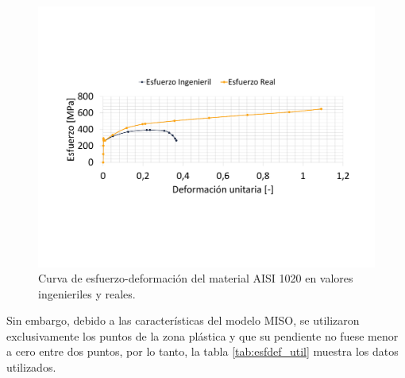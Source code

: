 
\begin{figure}[h]
\centering
\includegraphics[width=1\linewidth, trim={2cm 6cm 2cm 5cm},clip]{Imagenes/esf_real_ing.pdf}
\caption{Curva de esfuerzo-deformación del material AISI 1020 en valores ingenieriles y reales.}
\label{fig:esf_realing1}
\end{figure}

Sin embargo, debido a las características del modelo MISO, se utilizaron exclusivamente los puntos de la zona plástica y que su pendiente no fuese menor a cero entre dos puntos, por lo tanto, la tabla \ref{tab:esfdef_util} muestra los datos utilizados.


